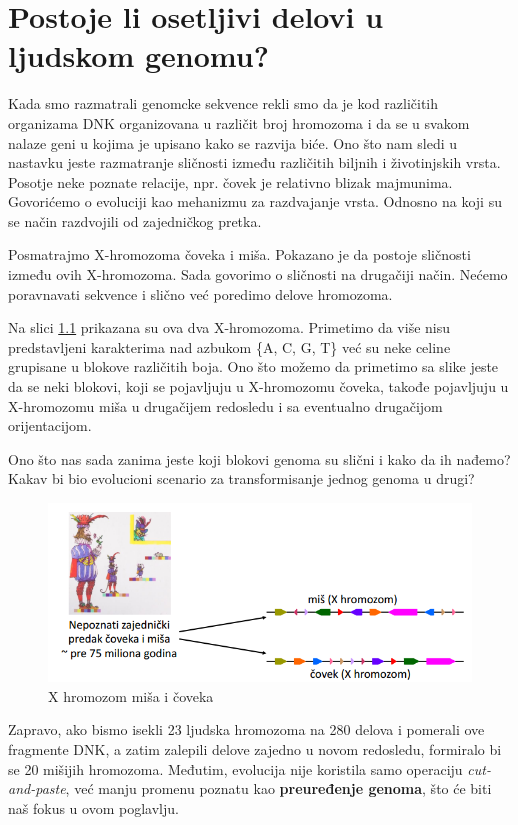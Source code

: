 \chapter {Postoje li osetljivi delovi u ljudskom genomu?}

Kada smo razmatrali genomcke  sekvence rekli smo da je kod različitih organizama DNK organizovana u različit broj hromozoma i da se u svakom nalaze geni u kojima je upisano kako se razvija biće. Ono što nam sledi u nastavku jeste razmatranje sličnosti između različitih biljnih i životinjskih vrsta. Posotje neke poznate relacije, npr. čovek je relativno blizak majmunima. Govorićemo o evoluciji kao mehanizmu za razdvajanje vrsta. Odnosno na koji su se način razdvojili od zajedničkog pretka.

Posmatrajmo X-hromozoma čoveka i miša. Pokazano je da postoje sličnosti između ovih X-hromozoma. Sada govorimo o sličnosti na drugačiji način. Nećemo poravnavati sekvence i slično već poredimo delove hromozoma. 

Na slici \ref{slika:X-hromozom} prikazana su ova dva X-hromozoma. Primetimo da više nisu predstavljeni karakterima nad azbukom \{A, C, G, T\} već su neke celine grupisane u blokove različitih boja. Ono što možemo da primetimo sa slike jeste da se neki blokovi, koji se pojavljuju u X-hromozomu čoveka, takođe pojavljuju u X-hromozomu miša u drugačijem redosledu i sa eventualno drugačijom orijentacijom. 

Ono što nas sada zanima jeste koji blokovi genoma su slični i kako da ih nađemo? Kakav bi bio evolucioni scenario za transformisanje jednog genoma u drugi?

\begin{figure}[h!]
\centering
\includegraphics[scale=0.7]{poglavlja/6/slike/predak_X.PNG}
\caption{X hromozom miša i čoveka}
\label{slika:X-hromozom}
\end{figure}


Zapravo, ako bismo isekli 23 ljudska hromozoma na 280 delova i pomerali ove fragmente DNK, a zatim zalepili delove zajedno u novom redosledu, formiralo bi se 20 mišijih hromozoma. Međutim, evolucija nije koristila samo operaciju \textit{cut-and-paste}, već manju promenu poznatu kao \textbf{preuređenje genoma}, što će biti naš  fokus u ovom poglavlju.

